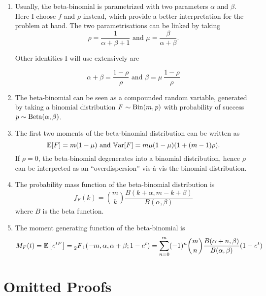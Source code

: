 \documentclass[../../main.tex]{subfiles}
\begin{document}
\begin{enumerate}
    \item Usually, the beta-binomial is parametrized with two parameters $\alpha$ and $\beta$. Here I choose $f$ and $\rho$ instead, which provide a better interpretation for the problem at hand. The two parametrisations can be linked by taking \begin{equation}
        \rho = \frac{1}{\alpha + \beta + 1} \text{ and } \mu = \frac{\beta}{\alpha + \beta}.
    \end{equation}

    Other identities I will use extensively are

    \begin{equation}
        \alpha + \beta = \frac{1-\rho}{\rho} \text{ and } \beta = \mu \ \frac{1-\rho}{\rho}
    \end{equation}

    \item The beta-binomial can be seen as a compounded random variable, generated by taking a binomial distribution $F \sim \text{Bin}(m, p)$ with probability of success $p \sim \text{Beta}(\alpha, \beta)$.
    \item The first two moments of the beta-binomial distribution can be written as \begin{equation}
        \mathbb{E}[F] = m (1 - \mu) \text{ and } \mathbb{V}\text{ar}[F] = m \mu (1 - \mu) (1 + (m - 1) \rho).
    \end{equation} If $\rho = 0$, the beta-binomial degenerates into a binomial distribution, hence $\rho$ can be interpreted as an ``overdispersion'' vis-à-vis the binomial distribution.
    \item The probability mass function of the beta-binomial distribution is \begin{equation} \label{eq:pmf_betabinomial}
        f_F(k) = \binom{m}{k} \frac{B(k + \alpha, m - k + \beta)}{B(\alpha, \beta)}
    \end{equation} where $B$ is the beta function. 
    \item The moment generating function of the beta-binomial is \begin{equation} \label{eq:mgf_betabinomial}
        M_F(t) = \mathbb{E}\left[ e^{tF} \right] = \prescript{}{2}{F}_1(-m, \alpha, \alpha + \beta; 1 - e^{t}) = \sum^m_{n = 0} (-1)^n \binom{m}{n} \frac{B(\alpha + n, \beta)}{B(\alpha, \beta)} (1 - e^t)
    \end{equation}
\end{enumerate}


\section{Omitted Proofs}
\end{document}
